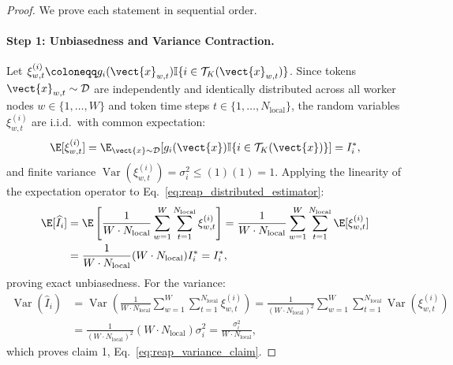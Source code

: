 \begin{proof}
We prove each statement in sequential order.

\paragraph{Step 1: Unbiasedness and Variance Contraction.}
Let $\xi_{w,t}^{(i)} \coloneqq g_i(\vect{x}_{w,t}) \mathbb{I}\{i \in \mathcal{T}_K(\vect{x}_{w,t})\}$.
Since tokens $\vect{x}_{w,t} \sim \mathcal{D}$ are independently and identically distributed across all worker nodes $w \in \{1, \dots, W\}$ and token time steps $t \in \{1, \dots, N_{\text{local}}\}$, the random variables $\xi_{w,t}^{(i)}$ are i.i.d.\ with common expectation:
\begin{equation}
\E[\xi_{w,t}^{(i)}] = \E_{\vect{x} \sim \mathcal{D}}[g_i(\vect{x}) \mathbb{I}\{i \in \mathcal{T}_K(\vect{x})\}] = I_i^*,
\end{equation}
and finite variance $\operatorname{Var}(\xi_{w,t}^{(i)}) = \sigma_i^2 \le (1)(1) = 1$.
Applying the linearity of the expectation operator to Eq.~\eqref{eq:reap_distributed_estimator}:
\begin{align}
\E[\widehat{I}_i] &= \E\left[ \frac{1}{W \cdot N_{\text{local}}} \sum_{w=1}^W \sum_{t=1}^{N_{\text{local}}} \xi_{w,t}^{(i)} \right] = \frac{1}{W \cdot N_{\text{local}}} \sum_{w=1}^W \sum_{t=1}^{N_{\text{local}}} \E[\xi_{w,t}^{(i)}] \nonumber \\
&= \frac{1}{W \cdot N_{\text{local}}} (W \cdot N_{\text{local}}) I_i^* = I_i^*,
\end{align}
proving exact unbiasedness.
For the variance:
\begin{align}
\operatorname{Var}(\widehat{I}_i) &= \operatorname{Var}\left( \frac{1}{W \cdot N_{\text{local}}} \sum_{w=1}^W \sum_{t=1}^{N_{\text{local}}} \xi_{w,t}^{(i)} \right) = \frac{1}{(W \cdot N_{\text{local}})^2} \sum_{w=1}^W \sum_{t=1}^{N_{\text{local}}} \operatorname{Var}(\xi_{w,t}^{(i)}) \nonumber \\
&= \frac{1}{(W \cdot N_{\text{local}})^2} (W \cdot N_{\text{local}}) \sigma_i^2 = \frac{\sigma_i^2}{W \cdot N_{\text{local}}},
\end{align}
which proves claim 1, Eq.~\eqref{eq:reap_variance_claim}.


\end{proof}

